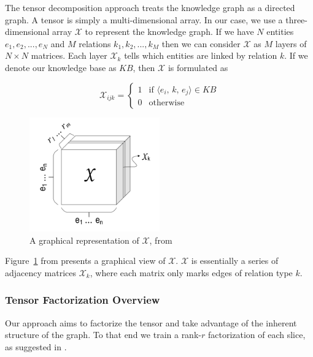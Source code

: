 \documentclass[pageno]{final_paper}
\begin{document}
The tensor decomposition approach treats the knowledge graph as a directed
graph. A tensor is simply a multi-dimensional array. In our case, we use a
three-dimensional array $\mathcal{X}$ to represent the knowledge graph. If we
have $N$ entities $e_1, e_2, ..., e_N$ and $M$ relations $k_1, k_2, ..., k_M$
then we can consider $\mathcal{X}$ as $M$ layers of $N\times N$ matrices. Each
layer $\mathcal{X}_k$ tells which entities are linked by relation $k$. If we
denote our knowledge base as $KB$, then $\mathcal{X}$ is formulated as

$$
\mathcal{X}_{ijk} =
\begin{cases}
    1 & \text{if } \langle e_i,\,k,\,e_j\rangle \in KB \\
    0 & \text{otherwise}
\end{cases}
$$

\begin{figure}[!tb]
    \centering
    \includegraphics[width=0.5\textwidth,keepaspectratio]{figures/tensor_figure.png}
    \caption{A graphical representation of $\mathcal{X}$, from \cite{Chang2014}}
    \label{fig: tensor figure}
\end{figure}

Figure~\ref{fig: tensor figure} from \cite{Chang2014} presents a graphical view
of $\mathcal{X}$. $\mathcal{X}$ is essentially a series of adjacency matrices
$\mathcal{X}_k$, where each matrix only marks edges of relation type $k$.

\subsubsection{Tensor Factorization Overview}
\label{Tensor Factorization Overview}

Our approach aims to factorize the tensor and take advantage of the inherent
structure of the graph. To that end we train a rank-$r$ factorization of each
slice, as suggested in \cite{Bader2007, Nickel2011}.
\end{document}
